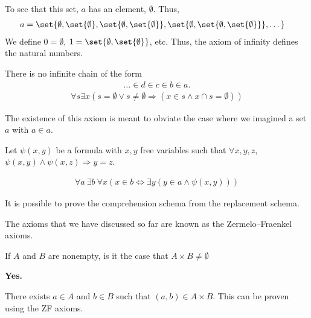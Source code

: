 \documentclass[10pt]{mypackage}
\begin{document}
\begin{remark}
  To see that this set, $a$ has an element, $\emptyset$. Thus,
  \begin{align*}
    a &= \set{\emptyset,\set{\emptyset},\set{\emptyset,\set{\emptyset}},\set{\emptyset,\set{\emptyset,\set{\emptyset}}},\dots}
  \end{align*}
  We define $0 = \emptyset$, $1 = \set{\emptyset,\set{\emptyset}}$, etc. Thus, the axiom of infinity defines the natural numbers.
\end{remark}
\begin{axiom}[Regularity]
  There is no infinite chain of the form
  \begin{align*}
    \dots\in d\in c\in b\in a.
  \end{align*}
  \begin{align*}
    \forall s\exists x\left(s = \emptyset \vee s\neq\emptyset \Rightarrow \left(x\in s\wedge x\cap s = \emptyset\right)\right)
  \end{align*}
\end{axiom}
\begin{remark}
  The existence of this axiom is meant to obviate the case where we imagined a set $a$ with $a\in a$.
\end{remark}
\begin{definition}
  Let $\psi(x,y)$ be a formula with $x,y$ free variables such that $\forall x,y,z$, $\psi(x,y)\wedge \psi(x,z)\Rightarrow y = z$.
\end{definition}
\begin{axiom}
  \begin{align*}
    \forall a\:\exists b\:\forall x\left(x\in b \Leftrightarrow \exists y\left(y\in a\wedge \psi(x,y)\right)\right)
  \end{align*}
\end{axiom}
\begin{remark}
  It is possible to prove the comprehension schema from the replacement schema.
\end{remark}
The axioms that we have discussed so far are known as the Zermelo--Fraenkel axioms. 
\begin{question}
  If $A$ and $B$ are nonempty, is it the case that $A\times B \neq \emptyset$
\begin{answer}
  \textbf{Yes.}\newline

  There exists $a\in A$ and $b\in B$ such that $(a,b)\in A\times B$. This can be proven using the ZF axioms.
\end{answer}
\end{question}
\end{document}
